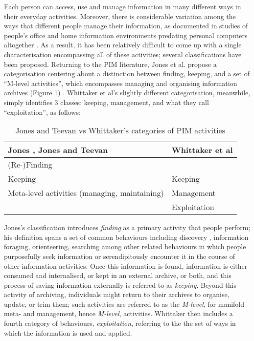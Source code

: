 \documentclass[graybox]{svmult}
\begin{document}
Each person can access, use and manage information in many different ways in their everyday activities.  Moreover, there is considerable variation among the ways that different people manage their information, as documented in studies of people's office and home information environments predating personal computers altogether \cite{malone1983people}.  As a result, it has been relatively difficult to come up with a single characterisation encompassing all of these activities; several classifications have been proposed.  Returning to the PIM literature, Jones et al. propose a categorisation centering about a distinction between finding, keeping, and a set of ``M-level activities'', which encompasses managing and organising information archives (Figure \ref{fig:pimactivities}) \cite{kftf}. Whittaker et al's slightly different categorisation, meanwhile, simply identifies 3 classes: keeping, management, and what they call ``exploitation'', as follows:

\begin{table}
\begin{center}
\begin{tabular}{p{4.5cm} | p{4.5cm}} 
Jones \cite{kftf}, Jones and Teevan \cite{teevan2006personal}& Whittaker et al \cite{whittaker2011personal}\\
\hline
(Re-)Finding &  \\
Keeping & Keeping \\
Meta-level activities (managing, maintaining) & Management \\
 & Exploitation \\
\end{tabular}
\caption{Jones and Teevan vs Whittaker's categories of PIM activities}
\label{fig:pimactivities}
\end{center}
\end{table}

Jones's classification introduces \emph{finding} as a primary activity that people perform; his definition spans a set of common behaviours including discovery \cite{chi2001using}, information foraging\cite{pirolli1999information}, orienteering\cite{teevan2004perfect, benyon1997navigation}, searching\cite{vakkari2003task} among other related behaviours in which people purposefully seek information or serendipitously encounter it in the course of other information activities.  Once this information is found, information is either consumed and internalised, or kept in an external archive, or both, and this process of saving information externally is referred to as \emph{keeping}.  Beyond this activity of archiving, individuals might return to their archives to organise, update, or trim them; such activities are referred to as the \emph{M-level}, for manifold meta- and management, hence \emph{M-level}, activities.  Whittaker then includes a fourth category of behaviours, \emph{exploitation}, referring to the the set of ways in which the information is used and applied.
\end{document}

